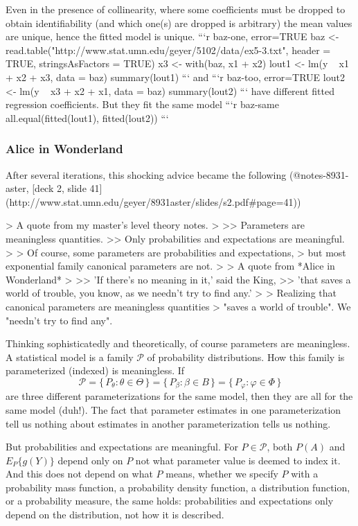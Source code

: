\documentclass[11pt]{article}
\begin{document}
Even in the presence of collinearity, where some coefficients must be
dropped to obtain identifiability (and which one(s) are dropped is arbitrary)
the mean values are unique, hence the fitted model is unique.
```{r baz-one, error=TRUE}
baz <- read.table("http://www.stat.umn.edu/geyer/5102/data/ex5-3.txt",
    header = TRUE, stringsAsFactors = TRUE)
x3 <-  with(baz, x1 + x2)
lout1 <- lm(y ~ x1 + x2 + x3, data = baz)
summary(lout1)
```
and
```{r baz-too, error=TRUE}
lout2 <- lm(y ~ x3 + x2 + x1, data = baz)
summary(lout2)
```
have different fitted regression coefficients.  But they fit the same model
```{r baz-same}
all.equal(fitted(lout1), fitted(lout2))
```

\subsubsection{Alice in Wonderland} \label{sec:alice}

After several iterations, this shocking advice became the following
(@notes-8931-aster, [deck 2,
slide 41](http://www.stat.umn.edu/geyer/8931aster/slides/s2.pdf#page=41))

> A quote from my master’s level theory notes.
>
>> Parameters are meaningless quantities.
>> Only probabilities and expectations are meaningful.
>
> Of course, some parameters are probabilities and expectations,
> but most exponential family canonical parameters are not.
>
> A quote from *Alice in Wonderland*
>
>> 'If  there’s  no  meaning  in  it,' said the King,
>> 'that saves a world of trouble, you know, as we needn't try to find any.’
>
> Realizing that canonical parameters are meaningless quantities
> "saves a world of trouble".  We "needn't try to find any".

Thinking sophisticatedly and theoretically, of course parameters are
meaningless.  A statistical model is a family $\mathcal{P}$ of probability
distributions.  How this family is parameterized (indexed) is meaningless.
If
$$
   \mathcal{P}
   =
   \{\, P_\theta : \theta \in \Theta \,\}
   =
   \{\, P_\beta : \beta \in B \,\}
   =
   \{\, P_\varphi : \varphi \in \Phi \,\}
$$
are three different parameterizations for the same model, then they are
all for the same model (duh!).  The fact that parameter estimates in one
parameterization tell us nothing about estimates in another parameterization
tells us nothing.

But probabilities and expectations are meaningful.
For $P \in \mathcal{P}$, both $P(A)$ and $E_P\{g(Y)\}$ depend only on $P$
not what parameter value is deemed to index it.  And this does not depend
on what $P$ means, whether we specify $P$ with a probability mass function,
a probability density function, a distribution function, or a probability
measure, the same holds: probabilities and expectations only depend on
the distribution, not how it is described.
\end{document}
